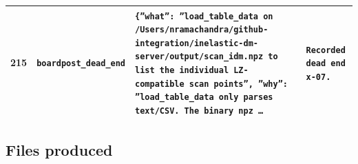 \documentclass[11pt,a4paper]{article}
\begin{document}
\begin{longtable}{@{}p{}p{}p{}p{}@{}}
215 & \texttt{board}\newline\texttt{post\_\allowbreak{}dead\_\allowbreak{}end} & \texttt{\{''what'':\allowbreak{} ''load\_\allowbreak{}table\_\allowbreak{}data on /\allowbreak{}Users/\allowbreak{}nramachandra/\allowbreak{}github-integration/\allowbreak{}inelastic-dm-server/\allowbreak{}output/\allowbreak{}scan\_\allowbreak{}idm.npz to list the individual LZ-compatible scan points'',\allowbreak{} ''why'':\allowbreak{} ''load\_\allowbreak{}table\_\allowbreak{}data only parses text/\allowbreak{}CSV. The binary npz \ldots{}\allowbreak{}} & \texttt{Recorded dead end x-07.} \\
\bottomrule\end{longtable}
\subsection{Files produced}
\end{document}
